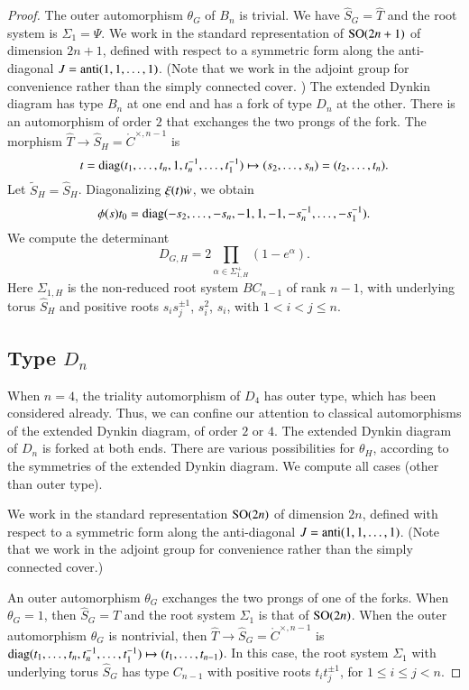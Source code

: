 \begin{proof}
The outer automorphism $\theta_G$ of $B_n$ is trivial.  We have $\hat S_G = \hat T$ and the root system is $\Sigma_1 =\Psi$.
We work in the standard representation of ${\operatorname{SO}}(2n+1)$ of dimension $2n+1$, defined with respect to a symmetric form 
along the anti-diagonal $J = {\operatorname{anti}}(1,1,\ldots,1)$.  (Note that we work in the adjoint group for convenience rather than the
simply connected cover. )
The extended Dynkin diagram has type $B_n$ at one end and has a fork of type $D_n$ at the other.
There is  an automorphism of order $2$ that exchanges the two prongs of the fork.
The morphism $\hat T\to \hat S_H=\ring{C}^{\times,n-1}$ is 
\[
t = {\operatorname{diag}}(t_1,\ldots,t_n,1,t_n^{-1},\ldots,t_1^{-1})\mapsto (s_2,\ldots,s_n)=(t_2,\ldots,t_n).
\]
Let $\tilde S_H= \hat S_H$.
Diagonalizing $\xi(t)\dot w$, we obtain
\begin{equation}
\phi(s)t_0 = {\operatorname{diag}}(-s_2,\ldots,-s_n,-1,1,-1,-s_n^{-1},\ldots,-s_1^{-1}).
\end{equation}
We compute the determinant
\begin{equation}
D_{G,H} = 2\prod_{\alpha\in \Sigma^+_{1,H}} (1-e^\alpha).
\end{equation}
Here $\Sigma_{1,H}$ is the non-reduced root system $BC_{n-1}$ of rank $n-1$, with underlying torus $\hat S_H$
and positive roots $s_i s_j^{\pm 1}$, $s_i^2$, $s_i$, with $1<i<j\le n$.


\subsection{Type $D_n$}

When $n=4$, the triality automorphism of $D_4$ has outer type, which has been considered already.  
Thus, we can confine our attention to classical automorphisms of the
extended Dynkin diagram, of order $2$ or $4$.  The extended Dynkin diagram of $D_n$ is forked at both ends.
  There are various possibilities for $\theta_H$,
according to the symmetries of the extended Dynkin diagram.  We compute all cases (other than outer type).



We work in the standard representation ${\operatorname{SO}}(2n)$
of dimension $2n$, defined with respect to a symmetric form 
along the anti-diagonal $J = {\operatorname{anti}}(1,1,\ldots,1)$.  (Note that we work in the adjoint group for convenience rather than the
simply connected cover.)

An outer automorphism $\theta_G$ exchanges the two prongs of one of the forks.
When $\theta_G=1$, then $\hat S_G = \hat T$ and the root system $\Sigma_1$ is that
of ${\operatorname{SO}}(2n)$.  When the outer automorphism $\theta_G$ is nontrivial, then
$\hat T\to \hat S_G =\ring{C}^{\times,n-1}$ is ${\operatorname{diag}}(t_1,\ldots,t_n,t_n^{-1},\ldots,t_1^{-1})\mapsto (t_1,\ldots,t_{n-1})$.
In this case, the root system $\Sigma_1$ with underlying torus $\hat S_G$ has type $C_{n-1}$ with positive roots $t_i t_j^{\pm 1}$, for $1\le i\le j<n$.


\end{proof}
